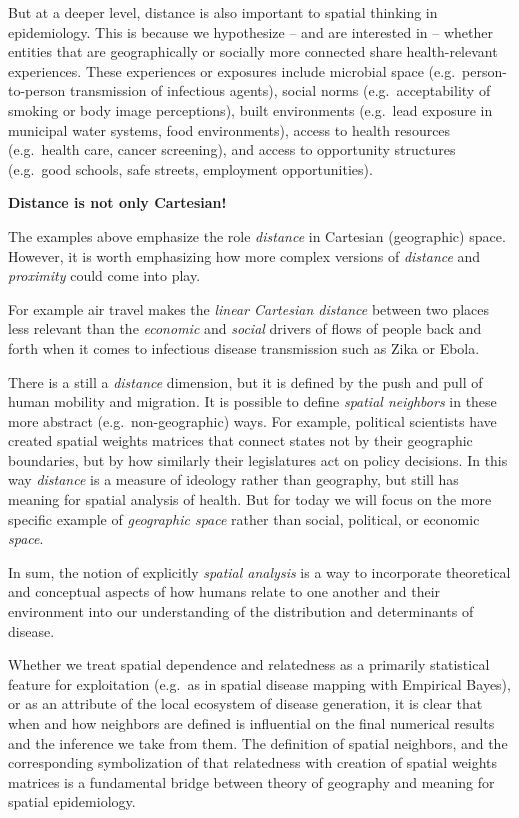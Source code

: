 \documentclass[
]{book}
\newenvironment{rmdnote}[1]
  {
  \begin{itemize}
  \renewcommand{\labelitemi}{
    \raisebox{-.7\height}[0pt][0pt]{
      {\setkeys{Gin}{width=3em,keepaspectratio}\texttt{[image: images/\#1]}}
    }
  }
  \setlength{\fboxsep}{1em}
  \begin{note}
  \item
  }
  {
  \end{note}
  \end{itemize}
  }
\begin{document}
But at a deeper level, distance is also important to spatial thinking in epidemiology. This is because we hypothesize -- and are interested in -- whether entities that are geographically or socially more connected share health-relevant experiences. These experiences or exposures include microbial space (e.g.~person-to-person transmission of infectious agents), social norms (e.g.~acceptability of smoking or body image perceptions), built environments (e.g.~lead exposure in municipal water systems, food environments), access to health resources (e.g.~health care, cancer screening), and access to opportunity structures (e.g.~good schools, safe streets, employment opportunities).

\begin{rmdnote}{note}
\textbf{Distance is not only Cartesian!}

The examples above emphasize the role \emph{distance} in Cartesian (geographic) space. However, it is worth emphasizing how more complex versions of \emph{distance} and \emph{proximity} could come into play.

For example air travel makes the \emph{linear Cartesian distance} between two places less relevant than the \emph{economic} and \emph{social} drivers of flows of people back and forth when it comes to infectious disease transmission such as Zika or Ebola.

There is a still a \emph{distance} dimension, but it is defined by the push and pull of human mobility and migration. It is possible to define \emph{spatial neighbors} in these more abstract (e.g.~non-geographic) ways. For example, political scientists have created spatial weights matrices that connect states not by their geographic boundaries, but by how similarly their legislatures act on policy decisions. In this way \emph{distance} is a measure of ideology rather than geography, but still has meaning for spatial analysis of health. But for today we will focus on the more specific example of \emph{geographic space} rather than social, political, or economic \emph{space}.

\end{rmdnote}

In sum, the notion of explicitly \emph{spatial analysis} is a way to incorporate theoretical and conceptual aspects of how humans relate to one another and their environment into our understanding of the distribution and determinants of disease.

Whether we treat spatial dependence and relatedness as a primarily statistical feature for exploitation (e.g.~as in spatial disease mapping with Empirical Bayes), or as an attribute of the local ecosystem of disease generation, it is clear that when and how neighbors are defined is influential on the final numerical results and the inference we take from them. The definition of spatial neighbors, and the corresponding symbolization of that relatedness with creation of spatial weights matrices is a fundamental bridge between theory of geography and meaning for spatial epidemiology.
\end{document}
